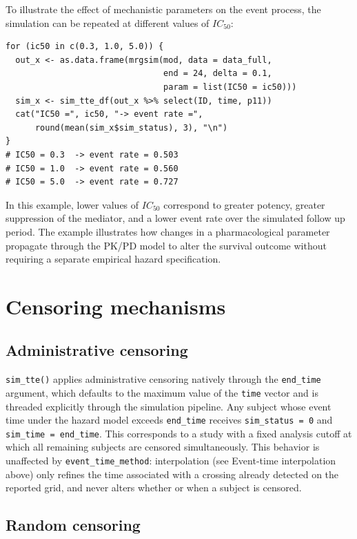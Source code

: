 To illustrate the effect of mechanistic parameters on the event process, the simulation can be repeated at different values of \(IC_{50}\):

\begin{verbatim}
for (ic50 in c(0.3, 1.0, 5.0)) {
  out_x <- as.data.frame(mrgsim(mod, data = data_full,
                                end = 24, delta = 0.1,
                                param = list(IC50 = ic50)))
  sim_x <- sim_tte_df(out_x %>% select(ID, time, p11))
  cat("IC50 =", ic50, "-> event rate =",
      round(mean(sim_x$sim_status), 3), "\n")
}
# IC50 = 0.3  -> event rate = 0.503
# IC50 = 1.0  -> event rate = 0.560
# IC50 = 5.0  -> event rate = 0.727
\end{verbatim}

In this example, lower values of \(IC_{50}\) correspond to greater potency, greater suppression of the mediator, and a lower event rate over the simulated follow up period. The example illustrates how changes in a pharmacological parameter propagate through the PK/PD model to alter the survival outcome without requiring a separate empirical hazard specification.

\section{Censoring mechanisms}\label{censoring}

\subsection{Administrative censoring}\label{administrative-censoring}

\texttt{sim\_tte()} applies administrative censoring natively through the
\texttt{end\_time} argument, which defaults to the maximum value of the
\texttt{time} vector and is threaded explicitly through the simulation
pipeline. Any subject whose event time under the hazard model
exceeds \texttt{end\_time} receives \texttt{sim\_status\ =\ 0} and
\texttt{sim\_time\ =\ end\_time}. This corresponds to a study with a fixed
analysis cutoff at which all remaining subjects are censored
simultaneously. This behavior is unaffected by \texttt{event\_time\_method}:
interpolation (see Event-time interpolation above) only refines the
time associated with a crossing already detected on the reported
grid, and never alters whether or when a subject is censored.

\subsection{Random censoring}\label{random-censoring}

